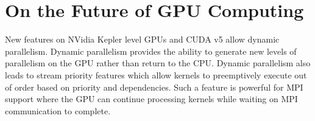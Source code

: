 \section{On the Future of GPU Computing}



%
%
%
%

New features on NVidia Kepler level GPUs and CUDA v5 allow dynamic parallelism. Dynamic parallelism provides the ability to generate new levels of parallelism on the GPU rather than return to the CPU.  Dynamic parallelism also leads to stream priority features which allow kernels to preemptively execute out of order based on priority and dependencies. Such a feature is powerful for MPI support where the GPU can continue processing kernels while waiting on MPI communication to complete. 
